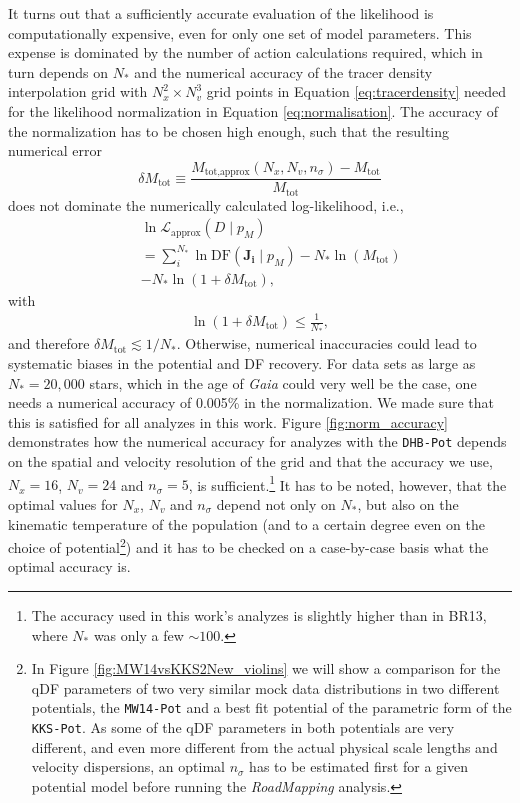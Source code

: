 \documentclass[iop,revtex4,numberedappendix,appendixfloats]{emulateapj}
\newcommand{\vect}[1]{\boldsymbol{#1}}
\newcommand{\pmodel}{\ensuremath{p_M}}
\newcommand{\RM}{{\sl RoadMapping}}
\begin{document}
It turns out that a sufficiently accurate evaluation of the likelihood is computationally expensive, even for only one set of model parameters. This expense is dominated by the number of action calculations required, which in turn depends on $N_*$ and the numerical accuracy of the tracer density interpolation grid with $N_x^2 \times N_v^3$ grid points in Equation \eqref{eq:tracerdensity} needed for the likelihood normalization in Equation \eqref{eq:normalisation}. The accuracy of the normalization has to be chosen high enough, such that the resulting numerical error 
\begin{equation}
\delta M_\text{tot} \equiv \frac{M_\text{tot,approx}(N_x,N_v,n_\sigma) - M_\text{tot} }{M_\text{tot}}\label{eq:relerrlikelihood}
\end{equation}
does not dominate the numerically calculated log-likelihood, i.e.,
\begin{eqnarray}
& & \ln \mathscr{L}_\text{approx}(D \mid \pmodel) \nonumber\\
&& = \sum_i^{N_*} \ln \text{DF}(\vect{J_i} \mid \pmodel) - N_* \ln(M_\text{tot})\nonumber\\
&& - N_* \ln (1 + \delta M_\text{tot}),\label{eq:loglikelihood_relerr}
\end{eqnarray}
with
\begin{eqnarray}
\ln (1 + \delta M_\text{tot}) \leq \frac{1}{N_{*}},\label{eq:accuracycondition}
\end{eqnarray}
and therefore $\delta M_\text{tot} \lesssim 1/N_*$. Otherwise, numerical inaccuracies could lead to systematic biases in the potential and DF recovery. For data sets as large as $N_* = 20,000$ stars, which in the age of \emph{Gaia} could very well be the case, one needs a numerical accuracy of 0.005\% in the normalization. We made sure that this is satisfied for all analyzes in this work. Figure \ref{fig:norm_accuracy} demonstrates how the numerical accuracy for analyzes with the \texttt{DHB-Pot} depends on the spatial and velocity resolution of the grid and that the accuracy we use, $N_x=16$, $N_v=24$ and $n_\sigma=5$, is sufficient.\footnote{The accuracy used in this work's analyzes is slightly higher than in BR13, where $N_*$ was only a few $\sim 100$.} It has to be noted, however, that the optimal values for $N_x$, $N_v$ and $n_\sigma$ depend not only on $N_*$, but also on the kinematic temperature of the population (and to a certain degree even on the choice of potential\footnote{In Figure \ref{fig:MW14vsKKS2New_violins} we will show a comparison for the qDF parameters of two very similar mock data distributions in two different potentials, the \texttt{MW14-Pot} and a best fit potential of the parametric form of the \texttt{KKS-Pot}. As some of the qDF parameters in both potentials are very different, and even more different from the actual physical scale lengths and velocity dispersions, an optimal $n_\sigma$ has to be estimated first for a given potential model before running the \RM{} analysis.}) and it has to be checked on a case-by-case basis what the optimal accuracy is. 
\end{document}
